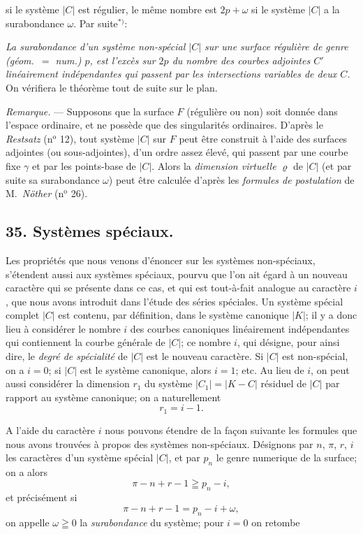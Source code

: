 \documentclass{article}
\begin{document}
si le système $|C|$ est régulier, le même nombre est $2p + \omega$ si le système $|C|$ a la surabondance $\omega$. Par suite${}^{*)}$:

\emph{La surabondance d'un système non-spécial $|C|$ sur une surface régulière de genre (géom.\ $=$ num.) $p$, est l'excès sur $2p$ du nombre des courbes adjointes $C'$ linéairement indépendantes qui passent par les intersections variables de deux $C$.} On vérifiera le théorème tout de suite sur le plan.

\emph{Remarque.} --- Supposons que la surface $F$ (régulière ou non) soit donnée dans l'espace ordinaire, et ne possède que des singularités ordinaires. D'après le \emph{Restsatz} (n${}^{\text{o}}$ 12), tout système $|C|$ sur $F$ peut être construit à l'aide des surfaces adjointes (ou sous-adjointes), d'un ordre assez élevé, qui passent par une courbe fixe $\gamma$ et par les points-base de $|C|$. Alors la \emph{dimension virtuelle} $\varrho$ de $|C|$ (et par suite sa surabondance $\omega$) peut être calculée d'après les \emph{formules de postulation} de M.\ \emph{Nöther} (n${}^{\text{o}}$ 26).

\subsection*{35. Systèmes spéciaux.}

Les propriétés que nous venons d'énoncer sur les systèmes non-spéciaux, s'étendent aussi aux systèmes spéciaux, pourvu que l'on ait égard à un nouveau caractère qui se présente dans ce cas, et qui est tout-à-fait analogue au caractère $i$, que nous avons introduit dans l'étude des séries spéciales. Un système spécial complet $|C|$ est contenu, par définition, dans le système canonique $|K|$; il y a donc lieu à considérer le nombre $i$ des courbes canoniques linéairement indépendantes qui contiennent la courbe générale de $|C|$; ce nombre $i$, qui désigne, pour ainsi dire, le \emph{degré de spécialité} de $|C|$ est le nouveau caractère. Si $|C|$ est non-spécial, on a $i = 0$; si $|C|$ est le système canonique, alors $i = 1$; etc. Au lieu de $i$, on peut aussi considérer la dimension $r_{1}$ du système $|C_{1}| = |K-C|$ résiduel de $|C|$ par rapport au système canonique; on a naturellement
\[ r_{1} = i - 1. \]

A l'aide du caractère $i$ nous pouvons étendre de la façon suivante les formules que nous avons trouvées à propos des systèmes non-spéciaux. Désignons par $n$, $\pi$, $r$, $i$ les caractères d'un système spécial $|C|$, et par $p_{n}$ le genre numerique de la surface; on a alors
\[ \pi - n + r - 1 \geqq p_{n} - i, \]
et précisément si
\[ \pi - n + r - 1 = p_{n} - i + \omega, \tag{7} \]
on appelle $\omega \geqq 0$ la \emph{surabondance} du système; pour $i = 0$ on retombe
\end{document}
